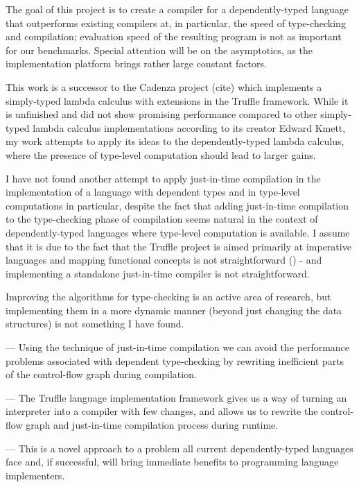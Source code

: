 \documentclass[english,zadani,odsaz]{fitthesis}
\begin{document}
The goal of this project is to create a compiler for a dependently-typed
language that outperforms existing compilers at, in particular, the speed of
type-checking and compilation; evaluation speed of the resulting program is not
as important for our benchmarks. Special attention will be on the asymptotics,
as the implementation platform brings rather large constant factors.

This work is a successor to the Cadenza project (cite) which implements a
simply-typed lambda calculus with extensions in the Truffle framework. While it
is unfinished and did not show promising performance compared to other
simply-typed lambda calculus implementations according to its creator Edward
Kmett, my work attempts to apply its ideas to the dependently-typed lambda
calculus, where the presence of type-level computation should lead to larger
gains.


I have not found another attempt to apply just-in-time compilation in the
implementation of a language with dependent types and in type-level computations
in particular, despite the fact that adding just-in-time compilation to the
type-checking phase of compilation seems natural in the context of
dependently-typed languages where type-level computation is available. I assume
that it is due to the fact that the Truffle project is aimed primarily at
imperative languages and mapping functional concepts is not straightforward
() - and implementing a standalone just-in-time compiler is not
straightforward.

Improving the algorithms for type-checking is an active area of research, but
implementing them in a more dynamic manner (beyond just changing the data
structures) is not something I have found.

--- Using the technique of just-in-time compilation we can avoid the performance
problems associated with dependent type-checking by rewriting inefficient parts
of the control-flow graph during compilation.

--- The Truffle language implementation framework gives us a way of turning an
interpreter into a compiler with few changes, and allows us to rewrite the
control-flow graph and just-in-time compilation process during runtime.

--- This is a novel approach to a problem all current dependently-typed
languages face and, if successful, will bring immediate benefits to programming
language implementers.
\end{document}
